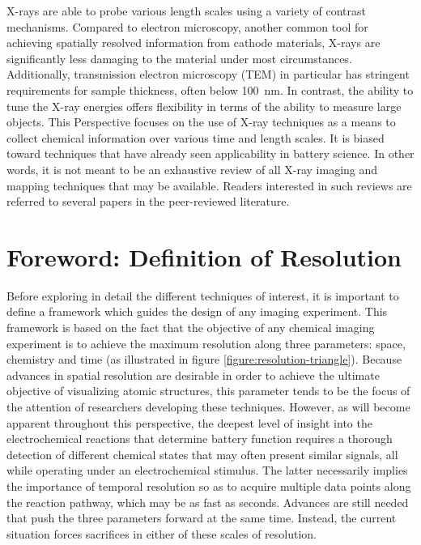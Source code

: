 \documentclass[journal=cmatex,manuscript=perspective]{achemso}
\begin{document}
X-rays are able to probe various length scales using a variety of
contrast mechanisms. Compared to electron microscopy, another common
tool for achieving spatially resolved information from cathode
materials, X-rays are significantly less damaging to the material
under most circumstances. Additionally, transmission electron
microscopy (TEM) in particular has stringent requirements for sample
thickness, often below \SI{100}{nm}. In contrast, the ability to tune
the X-ray energies offers flexibility in terms of the ability to
measure large objects. This Perspective focuses on the use of X-ray
techniques as a means to collect chemical information over various
time and length scales. It is biased toward techniques that have
already seen applicability in battery science. In other words, it is
not meant to be an exhaustive review of all X-ray imaging and mapping
techniques that may be available. Readers interested in such reviews
are referred to several papers in the peer-reviewed
literature\cite{rose2013, maire2014, monteiro2013, kawahara2015}.

\section{Foreword: Definition of Resolution}

Before exploring in detail the different techniques of interest, it is
important to define a framework which guides the design of any imaging
experiment. This framework is based on the fact that the objective of
any chemical imaging experiment is to achieve the maximum resolution
along three parameters: space, chemistry and time (as illustrated in
figure \ref{figure:resolution-triangle}). Because advances in spatial
resolution are desirable in order to achieve the ultimate objective of
visualizing atomic structures, this parameter tends to be the focus of
the attention of researchers developing these techniques. However, as
will become apparent throughout this perspective, the deepest level of
insight into the electrochemical reactions that determine battery
function requires a thorough detection of different chemical states
that may often present similar signals, all while operating under an
electrochemical stimulus. The latter necessarily implies the
importance of temporal resolution so as to acquire multiple data
points along the reaction pathway, which may be as fast as
seconds. Advances are still needed that push the three parameters
forward at the same time. Instead, the current situation forces
sacrifices in either of these scales of resolution.
\end{document}
